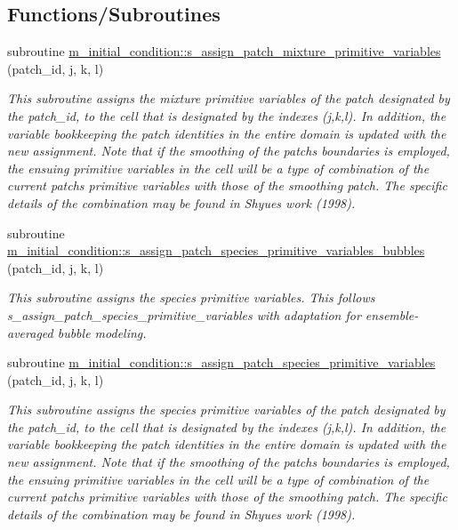 \subsection*{Functions/\+Subroutines}
\begin{DoxyCompactItemize}
\item 
subroutine \hyperlink{namespacem__initial__condition_ac414f08eb31dad32ed313767d214df72}{m\+\_\+initial\+\_\+condition\+::s\+\_\+assign\+\_\+patch\+\_\+mixture\+\_\+primitive\+\_\+variables} (patch\+\_\+id, j, k, l)
\begin{DoxyCompactList}\small\item\em This subroutine assigns the mixture primitive variables of the patch designated by the patch\+\_\+id, to the cell that is designated by the indexes (j,k,l). In addition, the variable bookkeeping the patch identities in the entire domain is updated with the new assignment. Note that if the smoothing of the patch\textquotesingle{}s boundaries is employed, the ensuing primitive variables in the cell will be a type of combination of the current patch\textquotesingle{}s primitive variables with those of the smoothing patch. The specific details of the combination may be found in Shyue\textquotesingle{}s work (1998). \end{DoxyCompactList}\item 
subroutine \hyperlink{namespacem__initial__condition_abd7cee461afabc01b81373e4be5a20c7}{m\+\_\+initial\+\_\+condition\+::s\+\_\+assign\+\_\+patch\+\_\+species\+\_\+primitive\+\_\+variables\+\_\+bubbles} (patch\+\_\+id, j, k, l)
\begin{DoxyCompactList}\small\item\em This subroutine assigns the species primitive variables. This follows s\+\_\+assign\+\_\+patch\+\_\+species\+\_\+primitive\+\_\+variables with adaptation for ensemble-\/averaged bubble modeling. \end{DoxyCompactList}\item 
subroutine \hyperlink{namespacem__initial__condition_a0024bfbe15f4f49cb2a5a2c574d89e19}{m\+\_\+initial\+\_\+condition\+::s\+\_\+assign\+\_\+patch\+\_\+species\+\_\+primitive\+\_\+variables} (patch\+\_\+id, j, k, l)
\begin{DoxyCompactList}\small\item\em This subroutine assigns the species primitive variables of the patch designated by the patch\+\_\+id, to the cell that is designated by the indexes (j,k,l). In addition, the variable bookkeeping the patch identities in the entire domain is updated with the new assignment. Note that if the smoothing of the patch\textquotesingle{}s boundaries is employed, the ensuing primitive variables in the cell will be a type of combination of the current patch\textquotesingle{}s primitive variables with those of the smoothing patch. The specific details of the combination may be found in Shyue\textquotesingle{}s work (1998). \end{DoxyCompactList}\item 

\end{DoxyCompactItemize}
